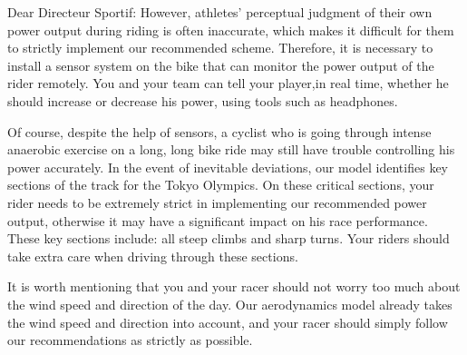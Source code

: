 \documentclass{mcmthesis}
\begin{document}
\begin{letter}{Dear Directeur Sportif: }
	However, athletes' perceptual judgment of their own power output during riding is often inaccurate, which makes it difficult for them to strictly implement our recommended scheme. Therefore, it is necessary to install a sensor system on the bike that can monitor the power output of the rider remotely. You and your team can tell your player,in real time, whether he should increase or decrease his power, using tools such as headphones.
	
	Of course, despite the help of sensors, a cyclist who is going through intense anaerobic exercise on a long, long bike ride may still have trouble controlling his power accurately. In the event of inevitable deviations, our model identifies key sections of the track for the Tokyo Olympics. On these critical sections, your rider needs to be extremely strict in implementing our recommended power output, otherwise it may have a significant impact on his race performance.  These key sections include: all steep climbs and sharp turns. Your riders should take extra care when driving through these sections.
	
	It is worth mentioning that you and your racer should not worry too much about the wind speed and direction of the day. Our aerodynamics model already takes the wind speed and direction into account, and your racer should simply follow our recommendations as strictly as possible.
	
	
\end{letter}



\newpage
\end{document}

